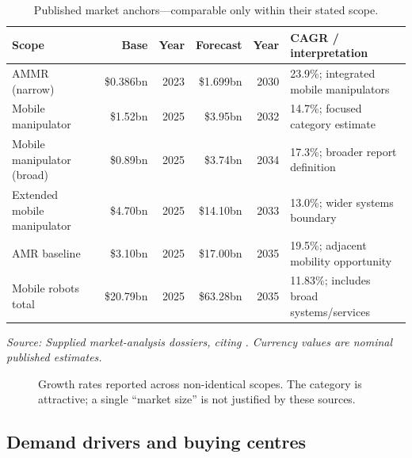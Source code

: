 \documentclass[11pt,a4paper]{article}
\newcommand{\source}[1]{\par\vspace{-0.25em}\footnotesize\color{gray}\emph{Source: #1}\normalsize}
\begin{document}
\begin{table}[ht]
\centering\small
\caption{Published market anchors---comparable only within their stated scope.}
\begin{tabularx}{\textwidth}{@{}lrrrrY@{}}
\toprule
Scope & Base & Year & Forecast & Year & CAGR / interpretation \\
\midrule
AMMR (narrow) & \$0.386bn & 2023 & \$1.699bn & 2030 & 23.9\%; integrated mobile manipulators \\
Mobile manipulator & \$1.52bn & 2025 & \$3.95bn & 2032 & 14.7\%; focused category estimate \\
Mobile manipulator (broad) & \$0.89bn & 2025 & \$3.74bn & 2034 & 17.3\%; broader report definition \\
Extended mobile manipulator & \$4.70bn & 2025 & \$14.10bn & 2033 & 13.0\%; wider systems boundary \\
AMR baseline & \$3.10bn & 2025 & \$17.00bn & 2035 & 19.5\%; adjacent mobility opportunity \\
Mobile robots total & \$20.79bn & 2025 & \$63.28bn & 2035 & 11.83\%; includes broad systems/services \\
\bottomrule
\end{tabularx}
\source{Supplied market-analysis dossiers, citing \cite{gvr,mnm,bri,htf,gmi,roots}. Currency values are nominal published estimates.}
\end{table}

\begin{figure}[ht]
\centering
{}
\caption{Growth rates reported across non-identical scopes. The category is attractive; a single ``market size'' is not justified by these sources.}
\label{fig:cagr}
\end{figure}

\subsection{Demand drivers and buying centres}
\end{document}
